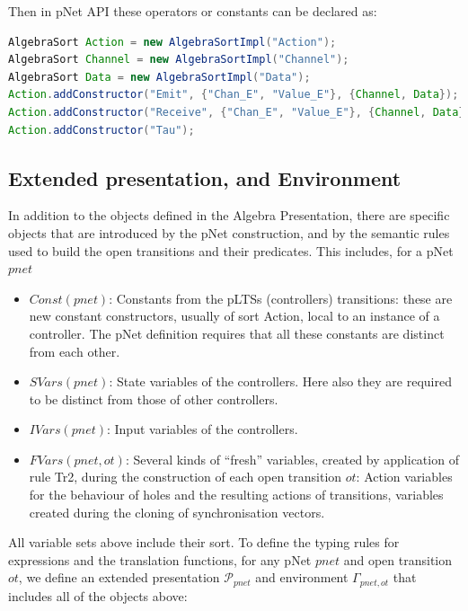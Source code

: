 \documentclass{lncs/llncs}
\begin{document}
Then in pNet API these operators or constants can be declared as:
\begin{lstlisting}[basicstyle=\scriptsize\ttfamily, language=java, frame=single]
AlgebraSort Action = new AlgebraSortImpl("Action");
AlgebraSort Channel = new AlgebraSortImpl("Channel");
AlgebraSort Data = new AlgebraSortImpl("Data");
Action.addConstructor("Emit", {"Chan_E", "Value_E"}, {Channel, Data});
Action.addConstructor("Receive", {"Chan_E", "Value_E"}, {Channel, Data});
Action.addConstructor("Tau");
\end{lstlisting}

\subsection{Extended presentation, and Environment}

In addition to the objects defined in the Algebra Presentation, there are
specific objects that are introduced by the pNet construction, and by
the semantic rules used to build the open transitions and their
predicates. This includes, for a pNet $pnet$
\begin{itemize}
\item $Const(pnet)$: Constants from the pLTSs (controllers) transitions: these are
  new constant constructors, usually of sort Action, local to an
  instance of a controller. The pNet definition requires that all
  these constants are distinct from each other.
\item $SVars(pnet)$: State variables of the controllers. Here also they are required
  to be distinct from those of other controllers.
\item $IVars(pnet)$: Input variables of the controllers.
\item $FVars(pnet,ot)$: Several kinds of ``fresh'' variables, created by application of
  rule Tr2, during the construction of each open transition $ot$:
  Action variables for the behaviour of holes and the 
  resulting actions of transitions, variables created during the cloning
  of synchronisation vectors.
\end{itemize}

\def\EPres{\mathcal{P}}
\def\EEnv{\Gamma}

All variable sets above include their sort.
To define the typing rules for expressions and the translation
functions, for any pNet $pnet$ and open transition $ot$, we define an
extended presentation $\EPres_{pnet}$ and environment $\EEnv_{pnet,ot}$ that includes all of the
objects above:
\end{document}
